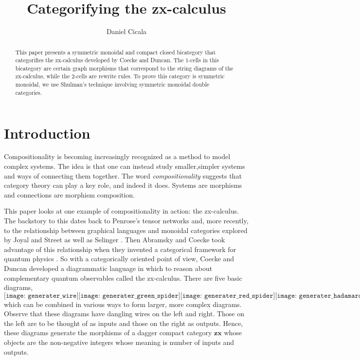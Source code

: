 \documentclass[11pt]{amsart}
\newcommand{\cat}[1]{\mathbf{#1}}
\theoremstyle{remark}
\theoremstyle{definition}
\begin{document}
	

\begin{abstract}
	This paper presents a symmetric monoidal and compact closed bicategory that categorifies the zx-calculus developed by Coecke and Duncan.  The $1$-cells in this bicategory are certain graph morphisms that correspond to the string diagrams of the zx-calculus, while the $2$-cells are rewrite rules. To prove this category is symmetric monoidal, we use Shulman's technique involving symmetric monoidal double categories.  
\end{abstract}

\title{Categorifying the zx-calculus}
\author{Daniel Cicala}
\maketitle

\section{Introduction}
\label{sec:Introduction}

Compositionality is becoming increasingly recognized as a method to model complex systems.  The idea is that one can instead study smaller,simpler systems and ways of connecting them together.  The word \emph{compositionality} suggests that category theory can play a key role, and indeed it does.  Systems are morphisms and connections are morphism composition.    

This paper looks at one example of compositionality in action: the zx-calculus.  The backstory to this dates back to Penrose's tensor networks \cite{Penrose_NegDimTensors} and, more recently, to the relationship between graphical languages and monoidal categories explored by Joyal and Street as well as Selinger \cite{JoyalStreet_GeomTensorCalc,Selinger_GraphicsMonCats}.  Then Abramsky and Coecke took advantage of this relationship when they invented a categorical framework for quantum physics \cite{AbramCoecke_CatSemanticQuantum}.  So with a categorically oriented point of view, Coecke and Duncan \cite{CoeckeDuncan_QuantumObs} developed a diagrammatic language in which to reason about complementary quantum observables called the zx-calculus.   There are five basic diagrams, 
\[
	\texttt{[image: generater\_wire]}
	\texttt{[image: generater\_green\_spider]}
	\texttt{[image: generater\_red\_spider]}
	\texttt{[image: generater\_hadamard]}
	\texttt{[image: generater\_diamond]}
\]
which can be combined in various ways to form larger, more complex diagrams.   Observe that these diagrams have dangling wires on the left and right.  Those on the left are to be thought of as inputs and those on the right as outputs.  Hence, these diagrams generate the morphisms of a dagger compact category $\cat{zx}$ whose objects are the non-negative integers whose meaning is number of inputs and outputs.
\end{document}
